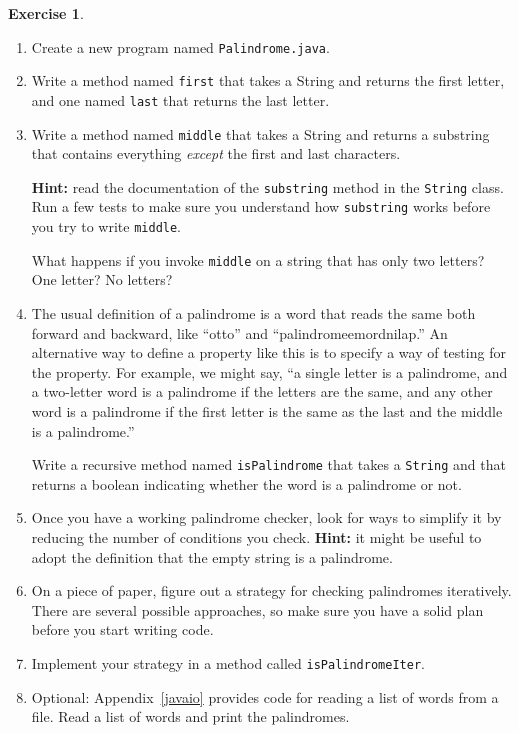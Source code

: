 \documentclass[12pt]{book}
\def\HINT{\textbf{Hint:}}
\theoremstyle{definition}
\newtheorem{excz}{Exercise}[chapter]
\newenvironment{exercise}{\bigskip\begin{excz}\mbox{}}{\end{excz}}
\begin{document}
\begin{exercise}
\label{palindrome}

\begin{enumerate}

\item Create a new program named {\tt Palindrome.java}.

\item Write a method named {\tt first}
that takes a String and returns the first letter, and one named
{\tt last} that returns the last letter.

\item Write a method named {\tt middle} that takes a String and
returns a substring that contains everything {\em except} the
first and last characters.

\HINT{} read the documentation of the {\tt substring} method in
the {\tt String} class.
Run a few tests to make sure you understand how {\tt substring} works
before you try to write {\tt middle}.

What happens if you invoke {\tt middle} on a string that has only
two letters?  One letter?  No letters?

\item The usual definition of a palindrome is a word that reads the
same both forward and backward, like ``otto'' and
``palindromeemordnilap.''  An alternative way to define a property
like this is to specify a way of testing for the property.  For
example, we might say, ``a single letter is a palindrome, and a
two-letter word is a palindrome if the letters are the same, and
any other word is a palindrome if
the first letter is the same as the
last and the middle is a palindrome.''

Write a recursive method named {\tt isPalindrome} that takes
a {\tt String} and that returns a boolean indicating whether the
word is a palindrome or not.

\item Once you have a working palindrome checker, look for ways
to simplify it by reducing the number of conditions you check.
\HINT{} it might be useful to adopt the definition that the empty
string is a palindrome.

\item On a piece of paper, figure out a strategy for checking
palindromes iteratively.  There are several possible approaches,
so make sure you have a solid plan before you start writing code.

\item Implement your strategy in a method called {\tt isPalindromeIter}.

\item Optional: Appendix~\ref{javaio} provides code for reading a list
of words from a file.  Read a list of words and print the palindromes.

\end{enumerate}
\end{exercise}
\end{document}
